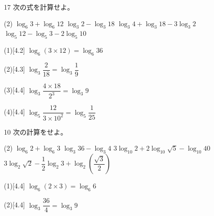 \documentclass[14pt,dvipdfmx]{jsarticle}
\begin{document}
\vfill
\nextpage

\vspace{-1.8zw}%
\begin{practiceprob}{17}
  次の式を計算せよ。
  \begin{tasks}[label=(\arabic*), label-width=1.6zw, item-indent=2zw, after-item-skip=0.08em](2)
    \task $\log_{6} 3 + \log_{6} 12$
    \task $\log_{3} 2 - \log_{3} 18$
    \task $\log_{3} 4 + \log_{3} 18 - 3\log_{3} 2$
    \task $\log_{5} 12 - \log_{5} 3 - 2\log_{5} 10$
  \end{tasks}
\end{practiceprob}

\begin{answerbox}{(1)}[4.2]
  $\log_{6}(3 \times 12)=\log_{6} 36$
\end{answerbox}
\begin{answerbox}{(2)}[4.3]
  $\log_{3} \dfrac{2}{18}=\log_{3} \dfrac{1}{9}$
\end{answerbox}
\begin{answerbox}{(3)}[4.4]
  $\log_{3} \dfrac{4 \times 18}{2^{3}}=\log_{3} 9$
\end{answerbox}
\begin{answerbox}{(4)}[4.4]
  $\log_{5} \dfrac{12}{3 \times 10^{2}}=\log_{5} \dfrac{1}{25}$
\end{answerbox}

\vspace{1em}
\begin{exerciseprob}{10}
  次の計算をせよ。
  \begin{tasks}[label=(\arabic*), label-width=1.6zw, item-indent=2zw, after-item-skip=0.08em](2)
    \task $\log_{6} 2 + \log_{6} 3$
    \task $\log_{3} 36 - \log_{3} 4$
    \task $3\log_{10} 2 + 2\log_{10} \sqrt{5} - \log_{10} 40$
    \task $3\log_{2} \sqrt{2} - \dfrac{1}{2}\log_{2} 3 + \log_{2}\!\left(\dfrac{\sqrt{3}}{2}\right)$
  \end{tasks}
\end{exerciseprob}

\noindent
\begin{minipage}[t]{0.49\linewidth}
\begin{answerbox}{(1)}[4.4]
  $\log_{6}(2 \times 3)=\log_{6} 6$
\end{answerbox}
\end{minipage}\hfill
\begin{minipage}[t]{0.49\linewidth}
\begin{answerbox}{(2)}[4.4]
  $\log_{3} \dfrac{36}{4}=\log_{3} 9$
\end{answerbox}
\end{minipage}
\end{document}
